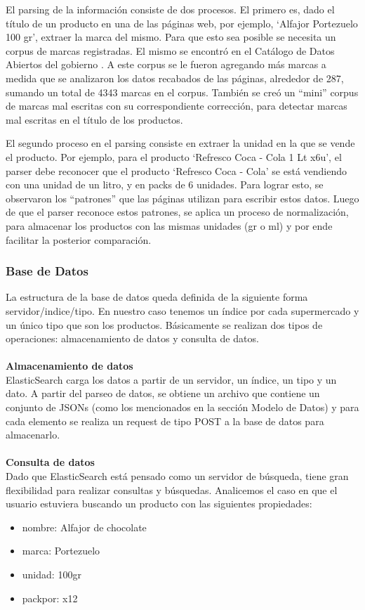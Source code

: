 \documentclass[12pt]{article} %
\begin{document}
El parsing de la información consiste de dos procesos. El primero es, dado el título de un producto en una de las páginas web, por ejemplo, ‘Alfajor Portezuelo 100 gr’, extraer la marca del mismo. Para que esto sea posible se necesita un corpus de marcas registradas. El mismo se encontró en el Catálogo de Datos Abiertos del gobierno \cite{DatosAbiertos}. A este corpus se le fueron agregando más marcas a medida que se analizaron los datos recabados de las páginas, alrededor de 287, sumando un total de 4343 marcas en el corpus. También se creó un “mini” corpus de marcas mal escritas con su correspondiente corrección, para detectar marcas mal escritas en el título de los productos.

El segundo proceso en el parsing consiste en extraer la unidad en la que se vende el producto. Por ejemplo, para el producto ‘Refresco Coca - Cola 1 Lt x6u’, el parser debe reconocer que el producto ‘Refresco Coca - Cola’ se está vendiendo con una unidad de un litro, y en packs de 6 unidades. Para lograr esto, se observaron los “patrones” que las páginas utilizan para escribir estos datos. Luego de que el parser reconoce estos patrones, se aplica un proceso de normalización, para almacenar los productos con las mismas unidades (gr o ml) y por ende facilitar la posterior comparación.

\subsubsection{Base de Datos}
La estructura de la base de datos queda definida de la siguiente forma servidor/indice/tipo. En nuestro caso tenemos un índice por cada supermercado y un único tipo que son los productos. 
Básicamente se realizan dos tipos de operaciones: almacenamiento de datos y consulta de datos. 
\\
\\
\textbf{Almacenamiento de datos}
\\
ElasticSearch carga los datos a partir de un servidor, un índice, un tipo y un dato. 
A partir del parseo de datos, se obtiene un archivo que contiene un conjunto de JSONs (como los mencionados en la sección Modelo de Datos) y para cada elemento se realiza un request de tipo POST a la base de datos para almacenarlo.
\\
\\
\textbf{Consulta de datos}
\\
Dado que ElasticSearch está pensado como un servidor de búsqueda, tiene gran flexibilidad para realizar consultas y búsquedas. Analicemos el caso en que el usuario estuviera buscando un producto con las siguientes propiedades:
\begin{itemize}\itemsep1pt \parskip0pt 
	\item nombre: Alfajor de chocolate
	\item marca: Portezuelo
	\item unidad: 100gr
	\item packpor: x12
\end{itemize}
\end{document}
